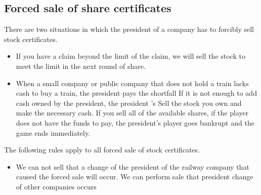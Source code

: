 \documentclass{article}
\begin{document}
\begin{CJK}{UTF8}{min}







\section{Forced sale of share certificates}

There are two situations in which the president of a company has to
forcibly sell stock certificates.
\begin{itemize}
\item If you have a claim beyond the limit of the claim, we will sell
  the stock to meet the limit in the next round of share.

\item When a small company or public company that does not hold a
  train lacks cash to buy a train, the president pays the shortfall If
  it is not enough to add cash owned by the president, the president
  ’s Sell ​​the stock you own and make the necessary cash. If you sell
  all of the available shares, if the player does not have the funds
  to pay, the president's player goes bankrupt and the game ends
  immediately.
\end{itemize}

The following rules apply to all forced sale of stock certificates.
\begin{itemize}
\item We can not sell that a change of the president of the railway
  company that caused the forced sale will occur. We can perform sale
  that president change of other companies occurs


\end{itemize}
\end{CJK}
\end{document}
